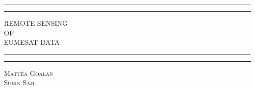 \documentclass{physics_article_B}
\begin{document}
\begin{titlepage} %

	\centering %
	
	\scshape %
	
	\vspace*{\baselineskip} %
	
	
	\rule{\textwidth}{1.6pt}\vspace*{-\baselineskip}\vspace*{2pt} %
	\rule{\textwidth}{0.4pt} %
	
	\vspace{0.75\baselineskip} %
	
	{\LARGE REMOTE SENSING\\ OF \\ EUMESAT DATA\\} %
	
	\vspace{0.75\baselineskip} %
	
	\rule{\textwidth}{0.4pt}\vspace*{-\baselineskip}\vspace{3.2pt} %
	\rule{\textwidth}{1.6pt} %
	
	\vspace{2\baselineskip} %
	
	
	
	\vspace*{3\baselineskip} %
	
	
	
	\vspace{0.9cm} %
	
	{\scshape\Large Matt\'ea Goalan\\Subin Saji \\ } %
	

\end{titlepage}
\end{document}
